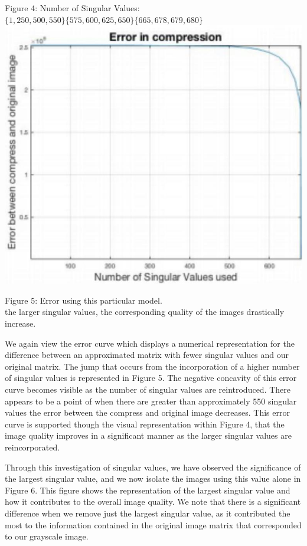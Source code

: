 \documentclass[10pt]{article}
\begin{document}
Figure 4: Number of Singular Values: $\{1,250,500,550\}\{575,600,625,650\}\{665,678,679,680\}$\\
\includegraphics[max width=\textwidth, center]{2025_04_09_7d70d965b908bc4c1892g-5(2)}

Figure 5: Error using this particular model.\\
the larger singular values, the corresponding quality of the images drastically increase.

We again view the error curve which displays a numerical representation for the difference between an approximated matrix with fewer singular values and our original matrix. The jump that occurs from the incorporation of a higher number of singular values is represented in Figure 5. The negative concavity of this error curve becomes visible as the number of singular values are reintroduced. There appears to be a point of when there are greater than approximately 550 singular values the error between the compress and original image decreases. This error curve is supported though the visual representation within Figure 4, that the image quality improves in a significant manner as the larger singular values are reincorporated.

Through this investigation of singular values, we have observed the significance of the largest singular value, and we now isolate the images using this value alone in Figure 6. This figure shows the representation of the largest singular value and how it contributes to the overall image quality. We note that there is a significant difference when we remove just the largest singular value, as it contributed the most to the information contained in the original image matrix that corresponded to our grayscale image.
\end{document}
